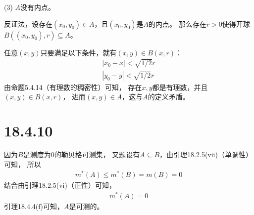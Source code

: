 \documentclass{article}
\begin{document}
(3) $A$没有内点。

反证法，设存在$(x_0, y_0) \in A$，且$(x_0, y_0)$是$A$的内点。
那么存在$r > 0$使得开球$B((x_0, y_0), r) \subseteq A$。

任意$(x, y)$只要满足以下条件，就有$(x, y) \in B(x, r)$：
\begin{align*}
 |x_0 - x| < \sqrt{1/2}r \\
 |y_0 - y| < \sqrt{1/2}r
\end{align*}
由命题5.4.14（有理数的稠密性）可知，
存在$x, y$都是有理数，并且$(x, y) \in B(x, r)$，
进而$(x, y) \in A$，这与$A$的定义矛盾。

\section*{18.4.10}

因为$B$是测度为$0$的勒贝格可测集，
又题设有$A \subseteq B$，由引理18.2.5(vii)（单调性）可知，
所以
\begin{align*}
  m^{\ast}(A) \leq m^{\ast}(B) = m(B) = 0
\end{align*}
结合由引理18.2.5(vi)（正性）可知，
\begin{align}
  m^{\ast}(A) = 0
\end{align}
引理18.4.4(f)可知，$A$是可测的。
\end{document}
